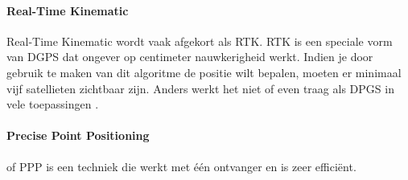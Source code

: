 \paragraph{Real-Time Kinematic}
Real-Time Kinematic wordt vaak afgekort als RTK. RTK is een speciale vorm van DGPS dat ongever op centimeter nauwkerigheid werkt. Indien je door gebruik te maken van dit algoritme de positie wilt bepalen, moeten er minimaal vijf satellieten zichtbaar zijn. Anders werkt het niet of even traag als DPGS in vele toepassingen \cite{LBibRTK}. 

\paragraph{Precise Point Positioning}
of PPP is een techniek die werkt met \'e\'en ontvanger en is zeer effici\"ent. \cite{LBibGNSS4}

